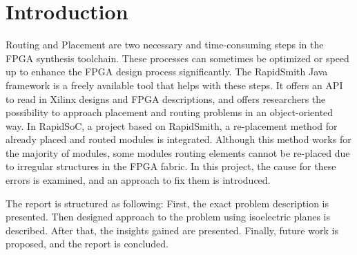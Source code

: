 \chapter{Introduction}
\label{cha:introduction}

Routing and Placement are two necessary and time-consuming steps in the FPGA synthesis toolchain. These processes can sometimes be optimized or speed up to enhance the FPGA design process significantly. The RapidSmith\cite{lavin2010rapid} Java framework is a freely available tool that helps with these steps. It offers an API to read in Xilinx designs and FPGA descriptions, and offers researchers the possibility to approach placement and routing problems in an object-oriented way. In RapidSoC\cite{wenzel2016rapidsoc}, a project based on RapidSmith, a re-placement method for already placed and routed modules is integrated. Although this method works for the majority of modules, some modules routing elements cannot be re-placed due to irregular structures in the FPGA fabric. In this project, the cause for these errors is examined, and an approach to fix them is introduced.

The report is structured as following: First, the exact problem description is presented. Then designed approach to the problem using isoelectric planes is described. After that, the insights gained are presented. Finally, future work is proposed, and the report is concluded.


